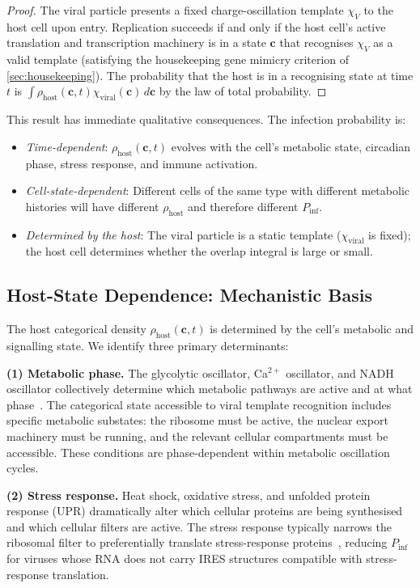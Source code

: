 \documentclass[11pt,twocolumn,a4paper]{article}
\theoremstyle{definition}
\theoremstyle{remark}
\newcommand{\Phost}{\rho_{\mathrm{host}}}
\newcommand{\chiviral}{\chi_{\mathrm{viral}}}
\newcommand{\vv}[1]{\boldsymbol{#1}}
\begin{document}
\begin{proof}
The viral particle presents a fixed charge-oscillation template $\chi_V$ to the host cell upon entry. Replication succeeds if and only if the host cell's active translation and transcription machinery is in a state $\vv{c}$ that recognises $\chi_V$ as a valid template (satisfying the housekeeping gene mimicry criterion of \cref{sec:housekeeping}). The probability that the host is in a recognising state at time $t$ is $\int \Phost(\vv{c},t) \chiviral(\vv{c})\,d\vv{c}$ by the law of total probability.
\end{proof}

This result has immediate qualitative consequences. The infection probability is:
\begin{itemize}
  \item \emph{Time-dependent}: $\Phost(\vv{c}, t)$ evolves with the cell's metabolic state, circadian phase, stress response, and immune activation.
  \item \emph{Cell-state-dependent}: Different cells of the same type with different metabolic histories will have different $\Phost$ and therefore different $P_{\mathrm{inf}}$.
  \item \emph{Determined by the host}: The viral particle is a static template ($\chiviral$ is fixed); the host cell determines whether the overlap integral is large or small.
\end{itemize}

\subsection{Host-State Dependence: Mechanistic Basis}

The host categorical density $\Phost(\vv{c}, t)$ is determined by the cell's metabolic and signalling state. We identify three primary determinants:

\textbf{(1) Metabolic phase.} The glycolytic oscillator, Ca$^{2+}$ oscillator, and NADH oscillator collectively determine which metabolic pathways are active and at what phase~\cite{Bhalla1999}. The categorical state accessible to viral template recognition includes specific metabolic substates: the ribosome must be active, the nuclear export machinery must be running, and the relevant cellular compartments must be accessible. These conditions are phase-dependent within metabolic oscillation cycles.

\textbf{(2) Stress response.} Heat shock, oxidative stress, and unfolded protein response (UPR) dramatically alter which cellular proteins are being synthesised and which cellular filters are active. The stress response typically narrows the ribosomal filter to preferentially translate stress-response proteins~\cite{Holcik2005}, reducing $P_{\mathrm{inf}}$ for viruses whose RNA does not carry IRES structures compatible with stress-response translation.
\end{document}
